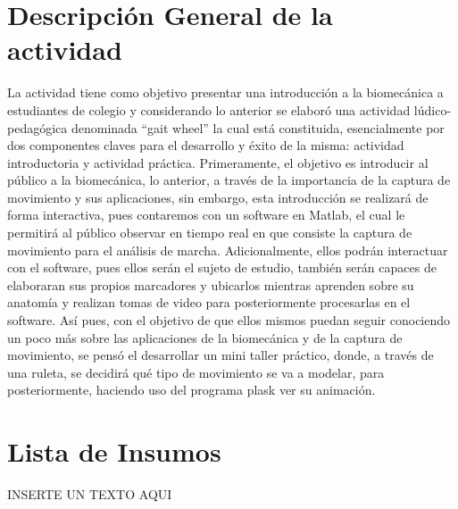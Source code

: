 \documentclass[journal,transmag]{IEEEtran}
\begin{document}
\section{Descripción General de la actividad}

La actividad tiene como objetivo presentar una introducción a la biomecánica a estudiantes de colegio y considerando lo anterior se elaboró una actividad lúdico-pedagógica denominada “gait wheel” la cual está constituida, esencialmente por dos componentes claves para el desarrollo y éxito de la misma: actividad introductoria y actividad práctica.
Primeramente, el objetivo es introducir al público a la biomecánica, lo anterior, a través de la importancia de la captura de movimiento y sus aplicaciones, sin embargo, esta introducción se realizará de forma interactiva, pues contaremos con un software en Matlab, el cual le permitirá al público observar en tiempo real en que consiste la captura de movimiento para el análisis de marcha. Adicionalmente, ellos podrán interactuar con el software, pues ellos serán el sujeto de estudio, también serán capaces de elaboraran sus propios marcadores y ubicarlos mientras aprenden sobre su anatomía y realizan tomas de video para posteriormente procesarlas en el software.
Así pues, con el objetivo de que ellos mismos puedan seguir conociendo un poco más sobre las aplicaciones de la biomecánica y de la captura de movimiento, se pensó el desarrollar un mini taller práctico, donde, a través de una ruleta, se decidirá qué tipo de movimiento se va a modelar, para posteriormente, haciendo uso del programa plask ver su animación.   


\section{Lista de Insumos}
	
	INSERTE UN TEXTO AQUI
	
\end{document}
